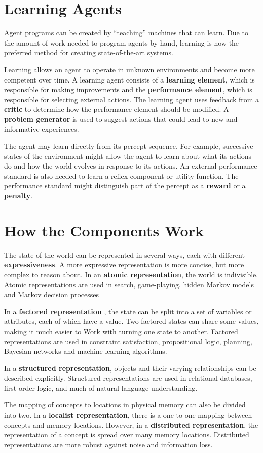 \documentclass{article}
\begin{document}
\section{Learning Agents}

Agent programs can be created by ``teaching'' machines that can learn. Due to the
amount of work needed to program agents by hand, learning is now the preferred method
for creating state-of-the-art systems.

Learning allows an agent to operate in unknown environments and become more competent
over time. A learning agent consists of a \textbf{learning element}, which is responsible
for making improvements and the \textbf{performance element}, which is responsible for
selecting external actions. The learning agent uses feedback from a \textbf{critic} to
determine how the performance element should be modified. A \textbf{problem generator} is
used to suggest actions that could lead to new and informative experiences.

The agent may learn directly from its percept sequence. For example, successive states
of the environment might allow the agent to learn about what its actions do and how
the world evolves in response to its actions. An external performance standard is also
needed to learn a reflex component or utility function. The performance standard
might distinguish part of the percept as a \textbf{reward} or a \textbf{penalty}.

\section{How the Components Work}

The state of the world can be represented in several ways, each with different
\textbf{expressiveness}. A more expressive representation is more concise, but more complex
to reason about. In an \textbf{atomic representation},
the world is indivisible. Atomic representations are used in search, game-playing,
hidden Markov models and Markov decision processes

In a \textbf{factored representation}
, the state can be split into a set of variables or attributes, each of which have
a value. Two factored states can share some values, making it much easier to Work
with turning one state to another. Factored representations are used in constraint
satisfaction, propositional logic, planning, Bayesian networks and machine learning
algorithms.

In a \textbf{structured representation}, objects and their varying relationships can be
described explicitly. Structured representations are used in relational databases,
first-order logic, and much of natural language understanding.

The mapping of concepts to locations in physical memory can also
be divided into two. In a \textbf{localist representation}, there
is a one-to-one mapping between concepts and memory-locations.
However, in a \textbf{distributed representation}, the representation
of a concept is spread over many memory locations.
Distributed representations are more robust against noise and information loss.
\end{document}
